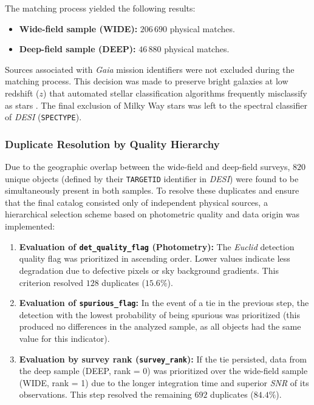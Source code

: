 The matching process yielded the following results:

\begin{itemize}
\item \textbf{Wide-field sample (WIDE):} $206\,690$ physical matches.
\item \textbf{Deep-field sample (DEEP):} $46\,880$ physical matches.
\end{itemize}

Sources associated with \textit{Gaia} mission identifiers were not excluded during the matching process. This decision was made to preserve bright galaxies at low redshift ($z$) that automated stellar classification algorithms frequently misclassify as stars \autocite{ar:ecker-2026}. The final exclusion of Milky Way stars was left to the spectral classifier of \textit{\gls{DESI}} (\texttt{SPECTYPE}).

\subsubsection{Duplicate Resolution by Quality Hierarchy}

Due to the geographic overlap between the wide-field and deep-field surveys, $820$ unique objects (defined by their \texttt{TARGETID} identifier in \textit{\gls{DESI}}) were found to be simultaneously present in both samples. To resolve these duplicates and ensure that the final catalog consisted only of independent physical sources, a hierarchical selection scheme based on photometric quality and data origin was implemented:

\begin{enumerate}
\item \textbf{Evaluation of \texttt{det\_quality\_flag} (Photometry):} The \textit{Euclid} detection quality flag was prioritized in ascending order. Lower values indicate less degradation due to defective pixels or sky background gradients. This criterion resolved $128$ duplicates ($15.6\%$).
\item \textbf{Evaluation of \texttt{spurious\_flag}:} In the event of a tie in the previous step, the detection with the lowest probability of being spurious was prioritized (this produced no differences in the analyzed sample, as all objects had the same value for this indicator).
\item \textbf{Evaluation by survey rank (\texttt{survey\_rank}):} If the tie persisted, data from the deep sample (DEEP, rank = 0) was prioritized over the wide-field sample (WIDE, rank = 1) due to the longer integration time and superior \textit{\gls{SNR}} of its observations. This step resolved the remaining $692$ duplicates ($84.4\%$).
\end{enumerate}

